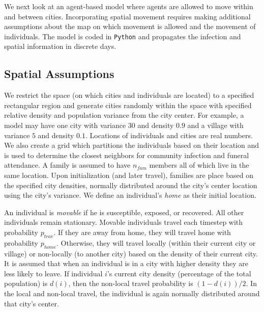 
We next look at an agent-based model where agents are allowed to move within and between cities. Incorporating spatial movement requires making additional assumptions about the map on which movement is allowed and the movement of individuals. The model is coded in \texttt{Python} and propagates the infection and spatial information in discrete days. 

\subsection{Spatial Assumptions}
We restrict the space (on which cities and individuals are located) to a specified rectangular region and generate cities randomly within the space with specified relative density and population variance from the city center. For example, a model may have one city with variance $30$ and density $0.9$ and a village with variance $5$ and density $0.1$. Locations of individuals and cities are real numbers. We also create a grid which partitions the individuals based on their location and is used to determine the closest neighbors for community infection and funeral attendance. A family is assumed to have $n_{fam}$ members all of which live in the same location. Upon initialization (and later travel), families are place based on the specified city densities, normally distributed around the city's center location using the city's variance. We define an individual's \emph{home} as their initial location.

An individual is \emph{movable} if he is susceptible, exposed, or recovered. All other individuals remain stationary. Movable individuals travel each timestep with probability $p_{trav}$. If they are away from home, they will travel home with probability $p_{home}$. Otherwise, they will travel locally (within their current city or village) or non-locally (to another city) based on the density of their current city. It is assumed that when an individual is in a city with higher density they are less likely to leave. If individual $i$'s current city density (percentage of the total population) is $d(i)$, then the non-local travel probability is $(1-d(i))/2$. In the local and non-local travel, the individual is again normally distributed around that city's center.

